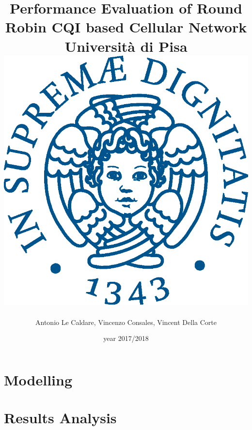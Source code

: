 \documentclass[12pt, a4paper]{report}
\title{
	{Performance Evaluation of Round Robin CQI based Cellular Network}\\
	{\large Università di Pisa\vspace{1cm}}\\
	{\includegraphics[scale=.5]{images/cherubino_pant541.eps}}
}
\author{Antonio Le Caldare, Vincenzo Consales, Vincent Della Corte}
\date{year 2017/2018}
\begin{document}
\maketitle

\tableofcontents

\chapter{Modelling}
    

\chapter{Results Analysis}
    
\end{document}

